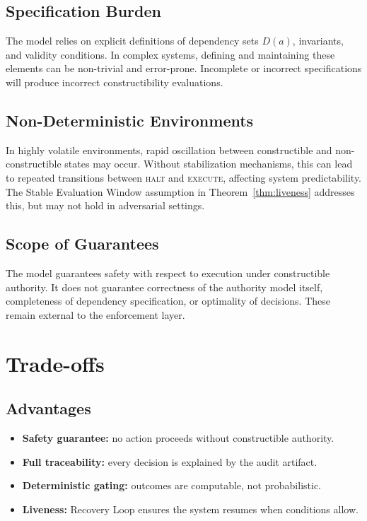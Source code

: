 \documentclass[11pt]{article}
\begin{document}
\subsection{Specification Burden}

The model relies on explicit definitions of dependency sets $D(a)$, invariants, and
validity conditions. In complex systems, defining and maintaining these elements can be
non-trivial and error-prone. Incomplete or incorrect specifications will produce
incorrect constructibility evaluations.

\subsection{Non-Deterministic Environments}

In highly volatile environments, rapid oscillation between constructible and
non-constructible states may occur. Without stabilization mechanisms, this can lead to
repeated transitions between \textsc{halt} and \textsc{execute}, affecting system
predictability. The Stable Evaluation Window assumption in Theorem~\ref{thm:liveness}
addresses this, but may not hold in adversarial settings.

\subsection{Scope of Guarantees}

The model guarantees safety with respect to execution under constructible authority. It
does not guarantee correctness of the authority model itself, completeness of dependency
specification, or optimality of decisions. These remain external to the enforcement layer.

\section{Trade-offs}

\subsection{Advantages}

\begin{itemize}
  \item \textbf{Safety guarantee:} no action proceeds without constructible authority.
  \item \textbf{Full traceability:} every decision is explained by the audit artifact.
  \item \textbf{Deterministic gating:} outcomes are computable, not probabilistic.
  \item \textbf{Liveness:} Recovery Loop ensures the system resumes when conditions allow.
\end{itemize}
\end{document}
